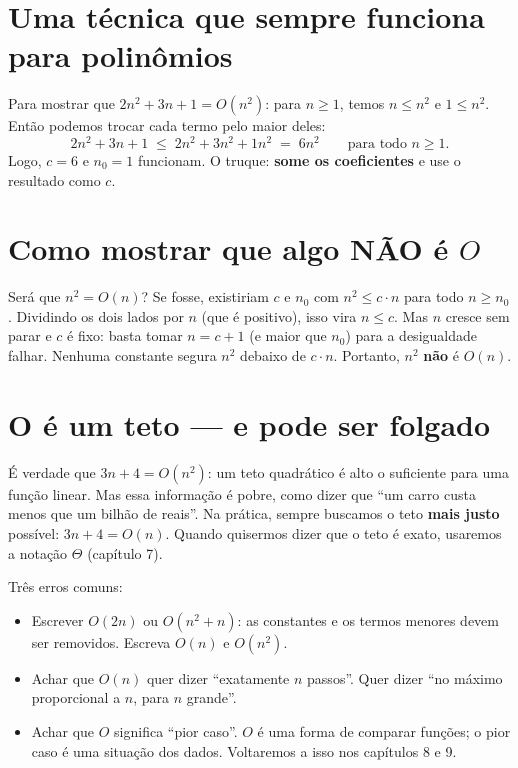 \section{Uma técnica que sempre funciona para polinômios}

Para mostrar que $2n^2 + 3n + 1 = O(n^2)$: para $n \ge 1$, temos $n \le n^2$ e $1 \le n^2$.
Então podemos trocar cada termo pelo maior deles:
\[
2n^2 + 3n + 1 \;\le\; 2n^2 + 3n^2 + 1n^2 \;=\; 6n^2 \qquad \text{para todo } n \ge 1.
\]
Logo, $c = 6$ e $n_0 = 1$ funcionam. O truque: \textbf{some os coeficientes} e use o resultado
como $c$.

\section{Como mostrar que algo NÃO é \texorpdfstring{$O$}{O}}

Será que $n^2 = O(n)$? Se fosse, existiriam $c$ e $n_0$ com $n^2 \le c \cdot n$ para todo
$n \ge n_0$. Dividindo os dois lados por $n$ (que é positivo), isso vira $n \le c$. Mas $n$ cresce
sem parar e $c$ é fixo: basta tomar $n = c + 1$ (e maior que $n_0$) para a desigualdade falhar.
Nenhuma constante segura $n^2$ debaixo de $c \cdot n$. Portanto, $n^2$ \textbf{não} é $O(n)$.

\section{O é um teto — e pode ser folgado}

É verdade que $3n + 4 = O(n^2)$: um teto quadrático é alto o suficiente para uma função linear.
Mas essa informação é pobre, como dizer que \enquote{um carro custa menos que um bilhão de reais}.
Na prática, sempre buscamos o teto \textbf{mais justo} possível: $3n + 4 = O(n)$. Quando quisermos
dizer que o teto é exato, usaremos a notação $\Theta$ (capítulo 7).

\begin{atencao}
Três erros comuns:
\begin{itemize}
  \item Escrever $O(2n)$ ou $O(n^2 + n)$: as constantes e os termos menores devem ser removidos.
        Escreva $O(n)$ e $O(n^2)$.
  \item Achar que $O(n)$ quer dizer \enquote{exatamente $n$ passos}. Quer dizer \enquote{no máximo
        proporcional a $n$, para $n$ grande}.
  \item Achar que $O$ significa \enquote{pior caso}. $O$ é uma forma de comparar funções; o pior
        caso é uma situação dos dados. Voltaremos a isso nos capítulos 8 e 9.
\end{itemize}
\end{atencao}

